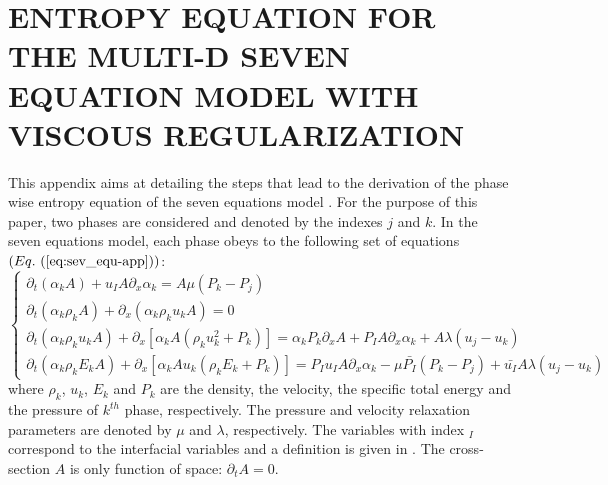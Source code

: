 %
%
%


\chapter{\uppercase{Entropy equation for the multi-D seven equation model with viscous regularization}\label{app:sev-equ-model-entropy}}
This appendix aims at detailing the steps that lead to the derivation of the phase wise entropy equation of the seven equations model \cite{SEM}. For the purpose of this paper, two phases are considered and denoted by the indexes $j$ and $k$. In the seven equations model, each phase obeys to the following set of equations $(\eqt{eq:sev_equ-app})$:
\begin{equation}
\label{eq:sev_equ-app}
\left\{
\begin{array}{llll}
\partial_t \left( \alpha_k  A\right) + u_I A \partial_x \alpha_k = A \mu \left( P_k - P_j \right)\\
\partial_t \left( \alpha_k \rho_k A \right) + \partial_x \left( \alpha_k \rho_k u_k A \right) = 0 \\
\partial_t \left( \alpha_k \rho_k u_k A \right) + \partial_x \left[ \alpha_k A \left( \rho_k u_k^2 + P_k \right) \right] = \alpha_k P_k \partial_x A + P_I A \partial_x \alpha_k + A \lambda \left( u_j - u_k \right) \\
\partial_t \left( \alpha_k \rho_k E_k A \right) + \partial_x \left[ \alpha_k A u_k \left( \rho_k E_k + P_k \right) \right] = P_I u_I A \partial_x \alpha_k - \mu \bar{P_I} \left( P_k-P_j \right) + \bar{u_I}A \lambda \left( u_j - u_k \right)
\end{array}
\right.
\end{equation}
where $\rho_k$, $u_k$, $E_k$ and $P_k$ are the density, the velocity, the specific total energy and the pressure of $k^{th}$ phase, respectively. The pressure and velocity relaxation parameters are denoted by $\mu$ and $\lambda$, respectively. The variables with index $_I$ correspond to the interfacial variables and a definition is given in . The cross-section $A$ is only function of space: $\partial_t A = 0$. 
